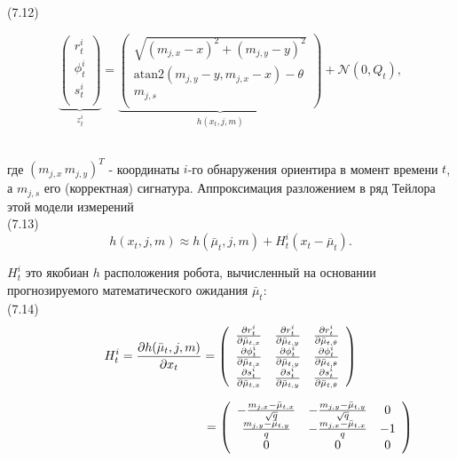 \documentclass[10pt,a4paper]{article}
\begin{document}
(7.12)
\begin{minipage}{0.2\textwidth}
	\begin{equation*}
	\underbrace{
		\left(\begin{array}{c}
		r_t^i\\
		\phi_t^i\\
		s_t^i\\
		\end{array}\right)}_{z_t^i}
	=
	\underbrace{
		\left(\begin{array}{c}
		\sqrt{(m_{j,x}-x)^2+(m_{j,y}-y)^2}\\
		\text{atan}2(m_{j,y}-y,m_{j,x}-x)-\theta\\
		m_{j,s}\\
		\end{array}\right)}_{h(x_t,j,m)}
	+\mathcal{N}(0,Q_t),
	\end{equation*}
\end{minipage}\\ 

где $(m_{j,x}\, m_{j,y})^T$ - координаты $i$-го обнаружения ориентира в момент времени $t$,  а $m_{j,s}$ его (корректная) сигнатура. Аппроксимация разложением в ряд Тейлора этой модели измерений \\

(7.13)
$$h(x_t,j,m)\approx h(\bar{\mu}_t,j,m)+H_t^i(x_t-\bar{\mu}_t).$$

$H^i_t$ это якобиан $h$ расположения робота, вычисленный на основании прогнозируемого математического ожидания $\bar{\mu}_t$:\\

(7.14)
\begin{equation*}
H_t^i=\frac{\partial h(\bar{\mu}_t,j,m)}{\partial x_t}\\
=\left(\begin{array}{ccc}
\frac{\partial r_t^i}{\partial\bar{\mu}_{t,x}}&\frac{\partial r_t^i}{\partial\bar{\mu}_{t,y}}&\frac{\partial r_t^i}{\partial\bar{\mu}_{t,\theta}}\\
\frac{\partial \phi_t^i}{\partial\bar{\mu}_{t,x}}&\frac{\partial \phi_t^i}{\partial\bar{\mu}_{t,y}}&\frac{\partial \phi_t^i}{\partial\bar{\mu}_{t,\theta}}\\
\frac{\partial s_t^i}{\partial\bar{\mu}_{t,x}}&\frac{\partial s_t^i}{\partial\bar{\mu}_{t,y}}&\frac{\partial s_t^i}{\partial\bar{\mu}_{t,\theta}}\\
\end{array}\right)
\end{equation*}

\begin{equation*}
\hspace{45mm} =\left(\begin{array}{ccc}
-\frac{m_{j,x}-\bar{\mu}_{t,x}}{\sqrt{q}}&-\frac{m_{j,y}-\bar{\mu}_{t,y}}{\sqrt{q}}&0\\
\frac{m_{j,y}-\bar{\mu}_{t,y}}{q}&-\frac{m_{j,x}-\bar{\mu}_{t,x}}{q}&-1\\
0&0&0\\
\end{array}\right)
\end{equation*}
\end{document}
